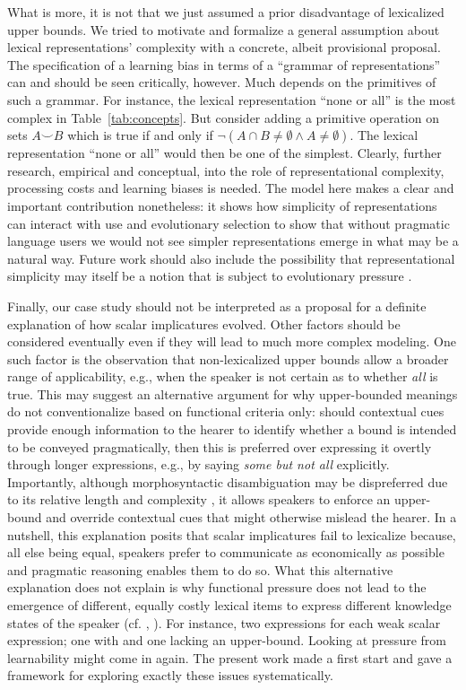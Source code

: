 \documentclass[a4paper, 11pt]{article}
\theoremstyle{Satz}
\begin{document}
What is more, it is not that we just assumed a prior disadvantage of lexicalized upper
bounds. We tried to motivate and formalize a general assumption about lexical representations' complexity
with a concrete, albeit provisional proposal. The specification of a learning bias in terms of
a ``grammar of representations'' can and should be seen critically, however. Much depends on the
primitives of such a grammar. For instance, the lexical representation ``none or all'' is the most complex in
Table~\ref{tab:concepts}. But consider adding a primitive operation on sets $A \smile B$
which is true if and only if $\neg(A \cap B \neq \emptyset \wedge A \neq \emptyset)$. The
lexical representation ``none or all'' would then be one of the simplest. Clearly, further research, empirical
and conceptual, into the role of representational complexity, processing costs and learning
biases is needed. The model here makes a clear and important contribution nonetheless: it shows
how simplicity of representations can interact with use and evolutionary selection to show that
without pragmatic language users we would not see simpler representations emerge in what may be a
natural way. Future work should also include the possibility that representational simplicity may
itself be a notion that is subject to evolutionary pressure
\citep[cf.][]{ThompsonKirby2016:Culture-Shapes-}. 

Finally, our case study should not be interpreted as a proposal for a definite explanation of
how scalar implicatures evolved. Other factors should be considered eventually even if they
will lead to much more complex modeling. One such factor is the observation that
non-lexicalized upper bounds allow a broader range of applicability, e.g., when the speaker is
not certain as to whether \emph{all} is true. This may suggest an alternative argument for why
upper-bounded meanings do not conventionalize based on functional criteria only: should
contextual cues provide enough information to the hearer to identify whether a bound is
intended to be conveyed pragmatically, then this is preferred over expressing it overtly
through longer expressions, e.g., by saying {\em some but not all} explicitly. Importantly,
although morphosyntactic disambiguation may be dispreferred due to its relative length and
complexity \citep{piantadosi+etal:2012b}, it allows speakers to enforce an upper-bound and
override contextual cues that might otherwise mislead the hearer. In a nutshell, this
explanation posits that scalar implicatures fail to lexicalize because, all else being equal,
speakers prefer to communicate as economically as possible and pragmatic reasoning enables them
to do so. What this alternative explanation does not explain is why functional pressure does
not lead to the emergence of different, equally costly lexical items to express different
knowledge states of the speaker (cf. \citealt[252-267]{horn:1984}, \citealt{horn:1972,traugott:2004,vdAuwera:2010}). For instance, two expressions for each weak scalar expression; one with and one lacking an upper-bound. 
Looking at pressure from learnability might come in again. The present work made a first start and gave a framework for exploring exactly these issues
systematically.
\end{document}

